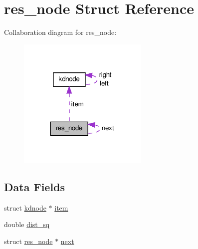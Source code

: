 \hypertarget{a00012}{\section{res\-\_\-node \-Struct \-Reference}
\label{df/d86/a00012}
}


\-Collaboration diagram for res\-\_\-node\-:
\nopagebreak
\begin{figure}[H]
\begin{center}
\leavevmode
\includegraphics[width=176pt]{dd/d32/a00041}
\end{center}
\end{figure}
\subsection*{\-Data \-Fields}
\begin{DoxyCompactItemize}
\item 
struct \hyperlink{a00009}{kdnode} $\ast$ \hyperlink{a00012_a9839da196515787759722e34b14a2d3f_a9839da196515787759722e34b14a2d3f}{item}
\item 
double \hyperlink{a00012_ab5db408f198264d49229dc7119b5a259_ab5db408f198264d49229dc7119b5a259}{dist\-\_\-sq}
\item 
struct \hyperlink{a00012}{res\-\_\-node} $\ast$ \hyperlink{a00012_a4a322132f093f66e895e0b5f5ee1bfea_a4a322132f093f66e895e0b5f5ee1bfea}{next}
\end{DoxyCompactItemize}


